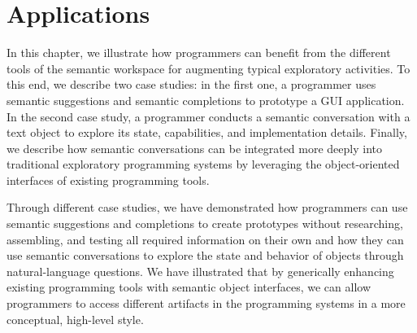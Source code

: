 
\chapter{Applications}
\label{cha:application}

In this chapter, we illustrate how programmers can benefit from the different tools of the semantic workspace for augmenting typical exploratory activities.
To this end, we describe two case studies: in the first one, a programmer uses semantic suggestions and semantic completions to prototype a GUI application.
In the second case study, a programmer conducts a semantic conversation with a text object to explore its state, capabilities, and implementation details.
Finally, we describe how semantic conversations can be integrated more deeply into traditional exploratory programming systems by leveraging the object-oriented interfaces of existing programming tools.

\pagebreak
{}

\begin{summary}
	Through different case studies, we have demonstrated how programmers can use semantic suggestions and completions to create prototypes without researching, assembling, and testing all required information on their own and how they can use semantic conversations to explore the state and behavior of objects through natural-language questions.
	We have illustrated that by generically enhancing existing programming tools with semantic object interfaces, we can allow programmers to access different artifacts in the programming systems in a more conceptual, high-level style.
\end{summary}
